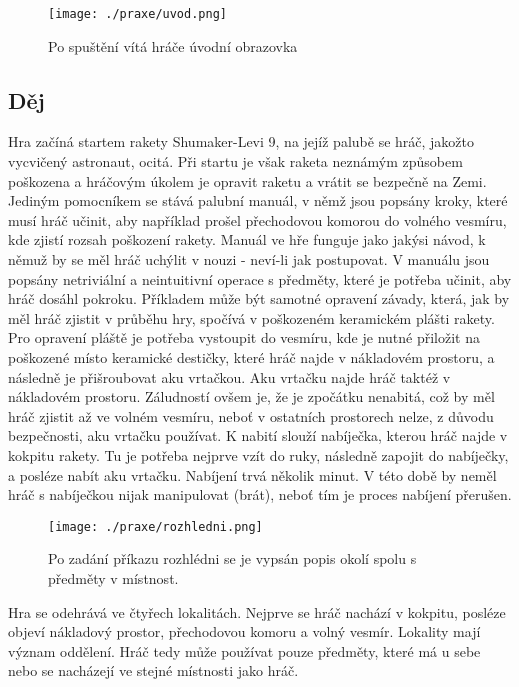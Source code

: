 \documentclass[main.tex]{subfiles}
\begin{document}
		\begin{figure}[h]
			\centering
			\texttt{[image: ./praxe/uvod.png]}
			\caption{Po spuštění vítá hráče úvodní obrazovka}
		\end{figure}
\subsection{Děj}
Hra začíná startem rakety Shumaker-Levi 9, na jejíž palubě se hráč, jakožto vycvičený astronaut, ocitá. Při startu je však raketa neznámým způsobem poškozena a hráčovým úkolem je opravit raketu a vrátit se bezpečně na Zemi. Jediným pomocníkem se stává palubní manuál, v němž jsou popsány kroky, které musí hráč učinit, aby například prošel přechodovou komorou do volného vesmíru, kde zjistí rozsah poškození rakety. Manuál ve hře funguje jako jakýsi návod, k němuž by se měl hráč uchýlit v nouzi - neví-li jak postupovat. V manuálu jsou popsány netriviální a neintuitivní operace s předměty, které je potřeba učinit, aby hráč dosáhl pokroku. Příkladem může být samotné opravení závady, která, jak by měl hráč zjistit v průběhu hry, spočívá v poškozeném keramickém plášti rakety. Pro opravení pláště je potřeba vystoupit do vesmíru, kde je nutné přiložit na poškozené místo keramické destičky, které hráč najde v nákladovém prostoru, a následně je přišroubovat aku vrtačkou. Aku vrtačku najde hráč taktéž v nákladovém prostoru. Záludností ovšem je, že je zpočátku nenabitá, což by měl hráč zjistit až ve volném vesmíru, neboť v ostatních prostorech nelze, z důvodu bezpečnosti, aku vrtačku používat. K nabití slouží nabíječka, kterou hráč najde v kokpitu rakety. Tu je potřeba nejprve vzít do ruky, následně zapojit do nabíječky, a posléze nabít aku vrtačku. Nabíjení trvá několik minut. V této době by neměl hráč s nabíječkou nijak manipulovat (brát), neboť tím je proces nabíjení přerušen.  
		\begin{figure}[h]
			\centering
			\texttt{[image: ./praxe/rozhledni.png]}
			\caption{Po zadání příkazu rozhlédni se je vypsán popis okolí spolu s předměty v místnost.}
		\end{figure}


Hra se odehrává ve čtyřech lokalitách. Nejprve se hráč nachází v kokpitu, posléze objeví nákladový prostor, přechodovou komoru a volný vesmír. Lokality mají význam oddělení. Hráč tedy může používat pouze předměty, které má u sebe nebo se nacházejí ve stejné místnosti jako hráč. 
\end{document}
